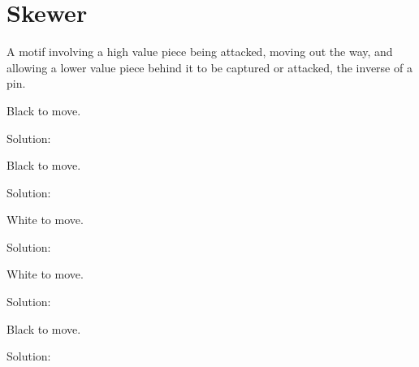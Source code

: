 \documentclass{book}
\begin{document}
\section{Skewer}
A motif involving a high value piece being attacked, moving out the way, and allowing a lower value piece behind it to be captured or attacked, the inverse of a pin.\begin{multicols}{2} 
\begin{samepage} 
\newgame 


 
\showboard
 
 Black to move. 
 
Solution: 
 
\end{samepage}\begin{samepage} 
\newgame 


 
\showboard
 
 Black to move. 
 
Solution: 
 
\end{samepage}\begin{samepage} 
\newgame 


 
\showboard
 
 White to move. 
 
Solution: 
 
\end{samepage}\begin{samepage} 
\newgame 


 
\showboard
 
 White to move. 
 
Solution: 
 
\end{samepage}\begin{samepage} 
\newgame 


 
\showboard
 
 Black to move. 
 
Solution: 
 

\end{samepage}
\end{multicols}
\end{document}
